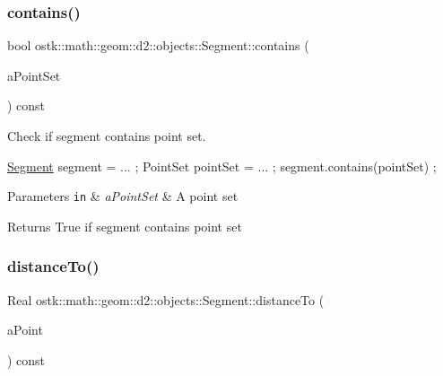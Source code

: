 \subsubsection{\texorpdfstring{contains()}{contains()}\hspace{0.1cm}{\footnotesize\ttfamily [2/2]}}
{\footnotesize\ttfamily bool ostk\+::math\+::geom\+::d2\+::objects\+::\+Segment\+::contains (\begin{DoxyParamCaption}\item[{const \hyperlink{classostk_1_1math_1_1geom_1_1d2_1_1objects_1_1_point_set}{Point\+Set} \&}]{a\+Point\+Set }\end{DoxyParamCaption}) const}



Check if segment contains point set. 


\begin{DoxyCode}
\hyperlink{classostk_1_1math_1_1geom_1_1d2_1_1objects_1_1_segment_a56c91f22315d7cefe9d5e9973330028d}{Segment} segment = ... ;
PointSet pointSet = ... ;
segment.contains(pointSet) ;
\end{DoxyCode}



\begin{DoxyParams}[1]{Parameters}
\mbox{\tt in}  & {\em a\+Point\+Set} & A point set \\
\hline
\end{DoxyParams}
\begin{DoxyReturn}{Returns}
True if segment contains point set 
\end{DoxyReturn}
\mbox{\label{classostk_1_1math_1_1geom_1_1d2_1_1objects_1_1_segment_a86ccd1f27b77bb7bc08c6461ccdf67b4}} 
\subsubsection{\texorpdfstring{distance\+To()}{distanceTo()}\hspace{0.1cm}{\footnotesize\ttfamily [1/2]}}
{\footnotesize\ttfamily Real ostk\+::math\+::geom\+::d2\+::objects\+::\+Segment\+::distance\+To (\begin{DoxyParamCaption}\item[{const \hyperlink{classostk_1_1math_1_1geom_1_1d2_1_1objects_1_1_point}{Point} \&}]{a\+Point }\end{DoxyParamCaption}) const}




